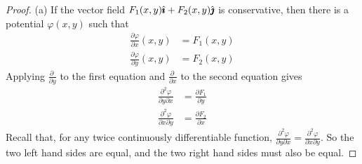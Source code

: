 \begin{proof}
(a) 
If the vector field $F_1(x,y)\hat{\pmb{\imath}} + F_2(x,y)\hat{\pmb{\jmath}}$ is conservative,
then there is a potential $\varphi(x,y)$ such that
\begin{align*}
\frac{\partial \varphi}{\partial x}(x,y) &= F_1(x,y) \\
\frac{\partial \varphi}{\partial y}(x,y) &= F_2(x,y) 
\end{align*}
Applying $\frac{\partial\ }{\partial y}$ to the first equation and 
$\frac{\partial\ }{\partial x}$ to the second equation gives
\begin{align*}
\frac{\partial^2 \varphi}{\partial y\partial x}
       &= \frac{\partial F_1}{\partial y} \\
\frac{\partial^2 \varphi}{\partial x\partial y}
       &= \frac{\partial F_2}{\partial x} 
\end{align*}
Recall that, for any twice continuously differentiable function,
$\frac{\partial^2 \varphi}{\partial y\partial x} =
\frac{\partial^2 \varphi}{\partial x\partial y}$.
So the two left hand sides are equal, 
and the two right hand sides must also be equal.


\end{proof}
